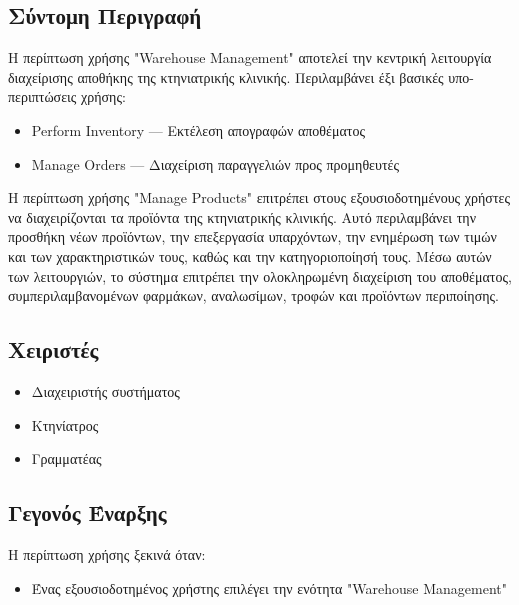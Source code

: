\documentclass[12pt,a4paper,twoside]{book}
\begin{document}
\subsection{Σύντομη Περιγραφή}
Η περίπτωση χρήσης "Warehouse Management" αποτελεί την κεντρική λειτουργία διαχείρισης αποθήκης της κτηνιατρικής κλινικής. Περιλαμβάνει έξι βασικές υπο-περιπτώσεις χρήσης: %
\begin{itemize}
  \item Perform Inventory --- Εκτέλεση απογραφών αποθέματος
  \item Manage Orders --- Διαχείριση παραγγελιών προς προμηθευτές
\end{itemize}
Η περίπτωση χρήσης "Manage Products" επιτρέπει στους εξουσιοδοτημένους χρήστες να διαχειρίζονται τα προϊόντα της κτηνιατρικής κλινικής. Αυτό περιλαμβάνει την προσθήκη νέων προϊόντων, την επεξεργασία υπαρχόντων, την ενημέρωση των τιμών και των χαρακτηριστικών τους, καθώς και την κατηγοριοποίησή τους. Μέσω αυτών των λειτουργιών, το σύστημα επιτρέπει την ολοκληρωμένη διαχείριση του αποθέματος, συμπεριλαμβανομένων φαρμάκων, αναλωσίμων, τροφών και προϊόντων περιποίησης. %

\subsection{Χειριστές}
\begin{itemize}
  \item Διαχειριστής συστήματος
  \item Κτηνίατρος
  \item Γραμματέας
\end{itemize}

\subsection{Γεγονός Έναρξης}
Η περίπτωση χρήσης ξεκινά όταν:
\begin{itemize}
  \item Ένας εξουσιοδοτημένος χρήστης επιλέγει την ενότητα "Warehouse Management" %
\end{itemize}
\end{document}
